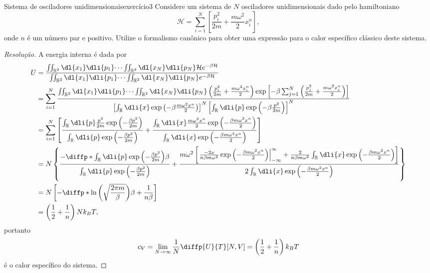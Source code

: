 \begin{exercício}{Sistema de osciladores unidimensionais}{exercício3}
    Considere um sistema de \(N\) osciladores unidimensionais dado pelo hamiltoniano
    \begin{equation*}
        \mathcal{H} = \sum_{i = 1}^N\left[\frac{p_i^2}{2m} + \frac{m\omega^2}{2}x_i^n\right],
    \end{equation*}
    onde \(n\) é um número par e positivo. Utilize o formalismo canônico para obter uma expressão para o calor específico clássico deste sistema.
\end{exercício}
\begin{proof}[Resolução]
    A energia interna é dada por
    \begin{align*}
        U &= \frac{\iint_{\mathbb{R}^2} \dl{x_1}\dli{p_1}\dots \iint_{\mathbb{R}^2} \dl{x_N}\dli{p_N} \mathcal{H}e^{-\beta \mathcal{H}}}{\iint_{\mathbb{R}^2} \dl{x_1}\dli{p_1}\dots \iint_{\mathbb{R}^2}\dl{x_N}\dli{p_N}e^{-\beta \mathcal{H}}}\\
          &= \sum_{i=1}^N\frac{\iint_{\mathbb{R}^2} \dl{x_1}\dli{p_1}\dots \iint_{\mathbb{R}^2} \dl{x_N}\dli{p_N} \left(\frac{p_i^2}{2m} + \frac{m\omega^2 x_i^n}{2}\right)\exp\left[-\beta \sum_{j=1}^N \left(\frac{p_j^2}{2m} + \frac{m\omega^2 x_j^n}{2}\right)\right]}{\left[\int_{\mathbb{R}} \dli{x} \exp\left(-\beta\frac{m\omega^2 x^n}{2}\right)\right]^N\left[\int_{\mathbb{R}}\dli{p}\exp\left(-\beta \frac{p^2}{2m}\right)\right]^N}\\
          &= \sum_{i=1}^N \left[\frac{\int_{\mathbb{R}} \dli{p} \frac{p^2}{2m}\exp\left(-\frac{\beta p^2}{2m}\right)}{\int_{\mathbb{R}}\dli{p}\exp\left(-\frac{\beta p^2}{2m}\right)}+\frac{\int_{\mathbb{R}}\dli{x} \frac{m\omega^2 x^n}{2}\exp\left(-\frac{\beta m\omega^2x^n}{2}\right)}{\int_{\mathbb{R}} \dli{x} \exp\left(-\frac{\beta m\omega^2 x^n}{2}\right)}\right]\\
          &= N\left\{\frac{-\diffp*{\int_{\mathbb{R}}\dli{p}\exp\left(-\frac{\beta p^2}{2m}\right)}{\beta}}{\int_{\mathbb{R}}\dli{p}\exp\left(-\frac{\beta p^2}{2m}\right)} + \frac{m\omega^2 \left[\left.\frac{-2x}{n \beta m \omega^2}\exp\left(-\frac{\beta m\omega^2 x^n}{2}\right)\right\vert_{-\infty}^\infty + \frac{2}{n \beta m \omega^2}\int_{\mathbb{R}}\dli{x}\exp\left(-\frac{\beta m\omega^2 x^n}{2}\right)\right]}{2\int_{\mathbb{R}}\dli{x} \exp\left(-\frac{\beta m \omega^2 x^n}{2}\right)}\right\}\\
          &= N\left[- \diffp*{\ln\left(\sqrt{\frac{2\pi m}{\beta}}\right)}{\beta} + \frac{1}{n \beta}\right]\\
          &= \left(\frac{1}{2} + \frac{1}{n}\right)Nk_B T,
    \end{align*}
    portanto
    \begin{equation*}
        c_V = \lim_{N\to \infty} \frac{1}{N} \diffp{U}{T}[N, V] = \left(\frac12 + \frac1n\right)k_B T
    \end{equation*}
    é o calor específico do sistema.
\end{proof}
